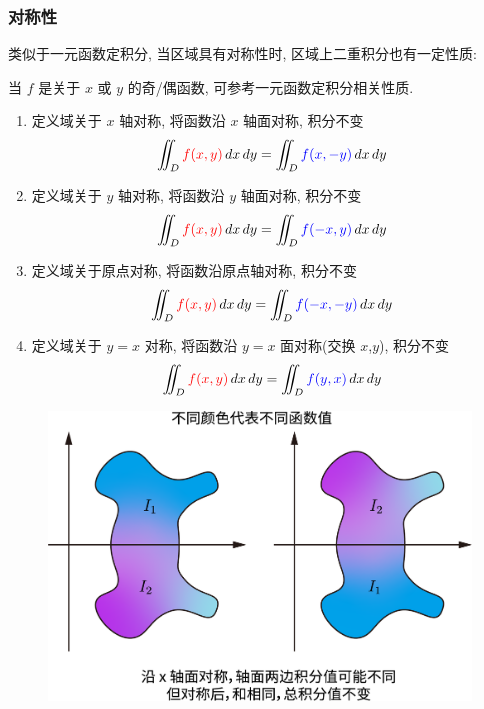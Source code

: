 \documentclass[UTF8]{ctexart}
\begin{document}
\subsubsection{对称性}
类似于一元函数定积分, 当区域具有对称性时, 区域上二重积分也有一定性质:

当 $ f $ 是关于 $ x $ 或 $ y $ 的奇/偶函数, 可参考一元函数定积分相关性质.

\begin{enumerate}
    \item 定义域关于 $ x $ 轴对称, 将函数沿 $ x $ 轴面对称, 积分不变 \[ \iint_D {\color{red} f(x, y)} \,dx\,dy = \iint_D {\color{blue} f(x, -y)} \,dx\,dy \]
    \item 定义域关于 $ y $ 轴对称, 将函数沿 $ y $ 轴面对称, 积分不变 \[ \iint_D {\color{red} f(x, y)} \,dx\,dy = \iint_D {\color{blue} f(-x, y)} \,dx\,dy \]
    \item 定义域关于原点对称, 将函数沿原点轴对称, 积分不变 \[ \iint_D {\color{red} f(x, y)} \,dx\,dy = \iint_D {\color{blue} f(-x, -y)} \,dx\,dy \]
    \item 定义域关于 $ y = x $ 对称, 将函数沿 $ y = x $ 面对称(交换 $x$,$y$), 积分不变 \[ \iint_D {\color{red} f(x, y)} \,dx\,dy = \iint_D {\color{blue} f(y, x)} \,dx\,dy \]
\end{enumerate}

\begin{figure}[H]
    \centering
    \includegraphics[width = 0.65\linewidth]{symmetry2}
\end{figure}
\end{document}
